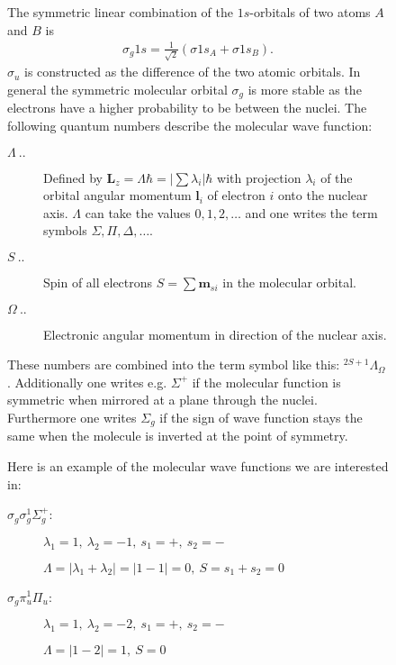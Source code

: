 \begin{figure}[!hbt]
\begin{fenster}
  {\small
    The
    symmetric linear combination of the $1s$-orbitals of two atoms $A$
    and $B$ is 
    \begin{align*} 
      \sigma_g1s=\frac{1}{\sqrt2}(\sigma 1s_A+\sigma 1s_B).
    \end{align*}
    $\sigma_u$ is constructed as the difference of the two atomic orbitals.
    In general the symmetric molecular orbital $\sigma_g$ is more stable as
    the electrons have a higher probability to be between the nuclei.
    The following quantum numbers describe the molecular wave function:
    \begin{description}
    \item[$\Lambda\ ..$] 
      
      Defined by $\mathbf{L}_z=\Lambda\hbar=|\sum\lambda_i|\hbar$ with
      projection $\lambda_i$ of the orbital angular momentum $\mathbf{l}_i$ of
      electron $i$ onto the nuclear axis. $\Lambda$ can take the
      values $0,1,2,\ldots$ and one writes the term symbols
      $\Sigma,\Pi,\Delta,\ldots$.
      
    \item[$S\ ..$]
      
      Spin of all electrons $S=\sum\mathbf{m}_{si}$ in the molecular orbital. 
      
    \item[$\Omega\ ..$] 
      
      Electronic angular momentum in direction of the nuclear axis.
      
    \end{description}
    These numbers are combined into the term symbol like this:
    ${}^{2S+1}\Lambda_\Omega$.  Additionally one writes e.g. $\Sigma^+$
    if the molecular function is symmetric when mirrored at a plane
    through the nuclei.  Furthermore one writes $\Sigma_g$ if the sign
    of wave function stays the same when the molecule is inverted at the
    point of symmetry.
    
    Here is an example of the molecular wave functions we are
    interested in:
    
    \begin{description}
    \item[$\sigma_g\sigma_g^1\Sigma_g^+$:]
      
      $\lambda_1=1,\ \lambda_2=-1,\ s_1=+,\ s_2=-$
      
      $\Lambda=|\lambda_1+\lambda_2|=|1-1|=0,\ S=s_1+s_2=0$
      
    \item[$\sigma_g\pi_u^1\Pi_u$:]
      
      $\lambda_1=1,\ \lambda_2=-2,\ s_1=+,\ s_2=-$
      
      $\Lambda=|1-2|=1,\ S=0$
      
    \end{description}
  }
\end{fenster}
\end{figure}


